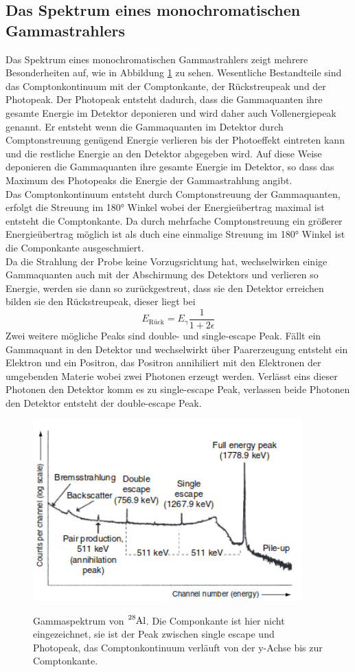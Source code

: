 \subsection{Das Spektrum eines monochromatischen Gammastrahlers}
Das Spektrum eines monochromatischen Gammastrahlers zeigt mehrere Besonderheiten auf, wie in Abbildung \ref{fig:Spektrum} zu
sehen. Wesentliche Bestandteile sind das Comptonkontinuum mit der Comptonkante, der Rückstreupeak
und der Photopeak. Der Photopeak entsteht dadurch, dass die Gammaquanten ihre gesamte Energie im Detektor deponieren
und wird daher auch Vollenergiepeak genannt. Er entsteht wenn die Gammaquanten im Detektor durch
Comptonstreuung genügend Energie verlieren bis der Photoeffekt eintreten kann und die restliche Energie
an den Detektor abgegeben wird. Auf diese Weise deponieren die Gammaquanten ihre gesamte Energie im
Detektor, so dass das Maximum des Photopeaks die Energie der Gammastrahlung angibt.\\
Das Comptonkontinuum entsteht durch Comptonstreuung der Gammaquanten, erfolgt die Streuung im
180° Winkel wobei der Energieübertrag maximal ist entsteht die Comptonkante. Da durch mehrfache
Comptonstreuung ein größerer Energieübertrag möglich ist als duch eine einmalige Streuung im 180° Winkel ist die
Componkante ausgeschmiert.\\
Da die Strahlung der Probe keine Vorzugsrichtung hat, wechselwirken einige Gammaquanten auch mit der
Abschirmung des Detektors und verlieren so Energie, werden sie dann so zurückgestreut, dass sie den
Detektor erreichen bilden sie den Rückstreupeak, dieser liegt bei
\begin{equation}
  E_{\text{Rück}}=E_{\gamma}\frac{1}{1+2\epsilon}
  \label{eqn:Rückstreu}
\end{equation}
Zwei weitere mögliche Peaks sind double- und single-escape Peak. Fällt ein Gammaquant in den Detektor und wechselwirkt über
Paarerzeugung entsteht ein Elektron und ein Positron, das Positron annihiliert mit den Elektronen der umgebenden Materie wobei
zwei Photonen erzeugt werden. Verlässt eins dieser Photonen den Detektor komm es zu single-escape Peak, verlassen beide
Photonen den Detektor entsteht der double-escape Peak.
\cite{Gilmore2}


\begin{figure}
  \centering
  \includegraphics[height=7cm]{Spektrum.png}
  \caption{Gammaspektrum von $\ce{^{28}Al}$. Die Componkante ist hier nicht eingezeichnet, sie ist der Peak zwischen single escape und Photopeak,
  das Comptonkontinuum verläuft von der y-Achse bis zur Comptonkante.}\cite{Gilmore2}
  \label{fig:Spektrum}
\end{figure}
